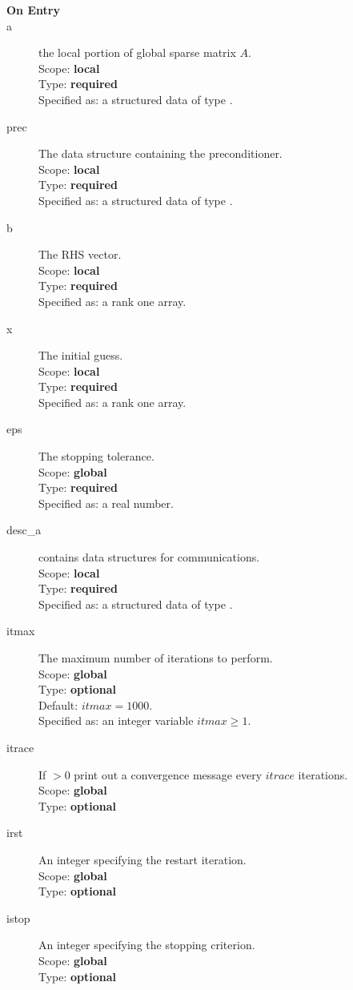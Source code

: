 \begin{description}
\item[\bf On Entry]
\item[a] the local portion of global sparse matrix
$A$. \\
Scope: {\bf local} \\
Type: {\bf required}\\
Specified as: a structured data of type \spdata.
\item[prec] The data structure containing the preconditioner.\\
Scope: {\bf local} \\
Type: {\bf required}\\
Specified as: a structured data of type \precdata.
\item[b] The RHS vector. \\
Scope: {\bf local} \\
Type: {\bf required}\\
Specified as: a rank one array.
\item[x] The initial guess. \\
Scope: {\bf local} \\
Type: {\bf required}\\
Specified as: a rank one array.
\item[eps] The stopping tolerance. \\
Scope: {\bf global} \\
Type: {\bf required}\\
Specified as: a real number. 
\item[desc\_a] contains data structures for communications.\\
Scope: {\bf local} \\
Type: {\bf required}\\
Specified as: a structured data of type \descdata.
\item[itmax]  The maximum number of iterations to perform.\\
Scope: {\bf global} \\
Type: {\bf optional}\\
Default: $itmax = 1000$.\\
Specified as: an integer variable $itmax \ge 1$.
\item[itrace]  If $>0$  print out a convergence message every $itrace$ iterations.\\
Scope: {\bf global} \\
Type: {\bf optional}\\
\item[irst]  An integer specifying the restart iteration.\\
Scope: {\bf global} \\
Type: {\bf optional}\\
\item[istop]  An integer specifying the stopping criterion.\\
Scope: {\bf global} \\
Type: {\bf optional}\\


\end{description}
